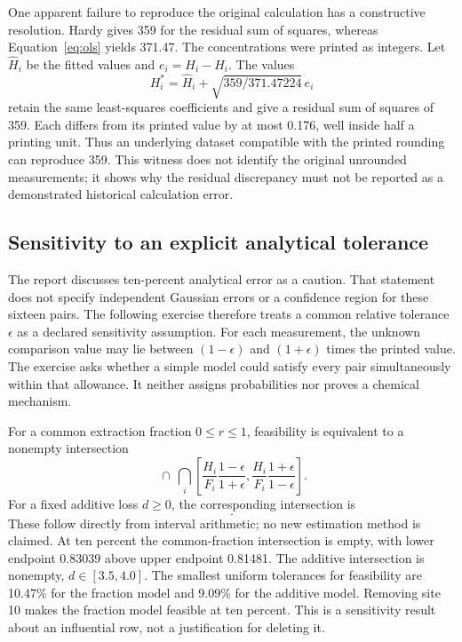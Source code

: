 \documentclass[11pt,a4paper]{article}
\begin{document}
One apparent failure to reproduce the original calculation has a constructive resolution. Hardy gives 359 for the residual sum of squares, whereas Equation~\ref{eq:ols} yields 371.47. The concentrations were printed as integers. Let $\widehat H_i$ be the fitted values and $e_i=H_i-\widehat H_i$. The values
\begin{equation}
H_i^*=\widehat H_i+\sqrt{359/371.47224}\,e_i
\label{eq:witness}
\end{equation}
retain the same least-squares coefficients and give a residual sum of squares of 359. Each differs from its printed value by at most 0.176, well inside half a printing unit. Thus an underlying dataset compatible with the printed rounding can reproduce 359. This witness does not identify the original unrounded measurements; it shows why the residual discrepancy must not be reported as a demonstrated historical calculation error.

\subsection{Sensitivity to an explicit analytical tolerance}
The report discusses ten-percent analytical error as a caution. That statement does not specify independent Gaussian errors or a confidence region for these sixteen pairs. The following exercise therefore treats a common relative tolerance $\epsilon$ as a declared sensitivity assumption. For each measurement, the unknown comparison value may lie between $(1-\epsilon)$ and $(1+\epsilon)$ times the printed value. The exercise asks whether a simple model could satisfy every pair simultaneously within that allowance. It neither assigns probabilities nor proves a chemical mechanism.

For a common extraction fraction $0\leq r\leq1$, feasibility is equivalent to a nonempty intersection
\begin{equation}
[0,1]\ \cap\ \bigcap_i
\left[\frac{H_i}{F_i}\frac{1-\epsilon}{1+\epsilon},
\frac{H_i}{F_i}\frac{1+\epsilon}{1-\epsilon}\right].
\label{eq:prop}
\end{equation}
For a fixed additive loss $d\geq0$, the corresponding intersection is
\begin{equation}
[0,\infty)\ \cap\ \bigcap_i
\left[(1-\epsilon)F_i-(1+\epsilon)H_i,
(1+\epsilon)F_i-(1-\epsilon)H_i\right].
\label{eq:add}
\end{equation}
These follow directly from interval arithmetic; no new estimation method is claimed. At ten percent the common-fraction intersection is empty, with lower endpoint 0.83039 above upper endpoint 0.81481. The additive intersection is nonempty, $d\in[3.5,4.0]$. The smallest uniform tolerances for feasibility are 10.47\% for the fraction model and 9.09\% for the additive model. Removing site 10 makes the fraction model feasible at ten percent. This is a sensitivity result about an influential row, not a justification for deleting it.
\end{document}

